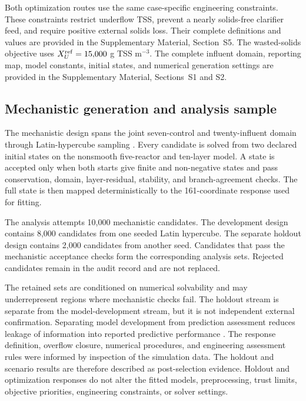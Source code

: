 \documentclass[a4paper,fleqn]{cas-sc}
\begin{document}
Both optimization routes use the same case-specific engineering constraints. These constraints restrict underflow TSS, prevent a nearly solids-free clarifier feed, and require positive external solids loss. Their complete definitions and values are provided in the Supplementary Material, Section~S5. The wasted-solids objective uses $X_U^{\rm ref}=15{,}000$ g TSS m$^{-3}$. The complete influent domain, reporting map, model constants, initial states, and numerical generation settings are provided in the Supplementary Material, Sections~S1 and S2.

\subsection{Mechanistic generation and analysis sample}

The mechanistic design spans the joint seven-control and twenty-influent domain through Latin-hypercube sampling \citep{McKay1979}. Every candidate is solved from two declared initial states on the nonsmooth five-reactor and ten-layer model. A state is accepted only when both starts give finite and non-negative states and pass conservation, domain, layer-residual, stability, and branch-agreement checks. The full state is then mapped deterministically to the 161-coordinate response used for fitting.

The analysis attempts 10,000 mechanistic candidates. The development design contains 8,000 candidates from one seeded Latin hypercube. The separate holdout design contains 2,000 candidates from another seed. Candidates that pass the mechanistic acceptance checks form the corresponding analysis sets. Rejected candidates remain in the audit record and are not replaced.

The retained sets are conditioned on numerical solvability and may underrepresent regions where mechanistic checks fail. The holdout stream is separate from the model-development stream, but it is not independent external confirmation. Separating model development from prediction assessment reduces leakage of information into reported predictive performance \citep{Kaufman2012}. The response definition, overflow closure, numerical procedures, and engineering assessment rules were informed by inspection of the simulation data. The holdout and scenario results are therefore described as post-selection evidence. Holdout and optimization responses do not alter the fitted models, preprocessing, trust limits, objective priorities, engineering constraints, or solver settings.
\end{document}
